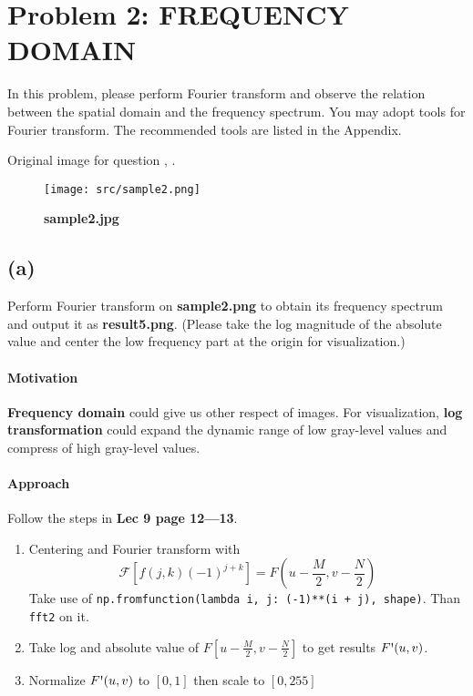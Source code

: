 \newpage
\section{Problem 2: FREQUENCY DOMAIN}\label{problem-2-frequency-domain}
In this problem, please perform Fourier transform and observe the relation between the spatial domain and the frequency spectrum. You may adopt tools for Fourier transform. The recommended tools are listed in the Appendix.

Original image  for question  , .
\begin{figure}
    \centering
    \texttt{[image: src/sample2.png]}
    \caption{\textbf{sample2.jpg}}
    \label{sample2}
\end{figure}

\subsection{(a)}\label{2_a}
Perform Fourier transform on \textbf{sample2.png} to obtain its frequency spectrum and output it as \textbf{result5.png}. (Please take the log magnitude of the absolute value and center the low frequency part at the origin for visualization.)

\paragraph{Motivation}
\textbf{Frequency domain} could give us other respect of images.
For visualization, \textbf{log transformation} could expand the dynamic range of low gray-level values and compress of high gray-level values.

\paragraph{Approach}
Follow the steps in \textbf{Lec 9 page 12---13}.
\begin{enumerate}
    \item Centering and Fourier transform with \\
	\[
	    \mathcal{F}[f(j, k)(-1)^{j+k}] = F(u - \frac{M}{2}, v - \frac{N}{2})
	\]
	Take use of \texttt{np.fromfunction(lambda i, j: (-1)**(i + j), shape)}.
	Than \texttt{fft2} on it.
    \item Take log and absolute value of \(F[u - \frac{M}{2}, v - \frac{N}{2}]\) to get results \(F\textnormal{\textquotesingle}(u, v)\).
    \item Normalize \(F\textnormal{\textquotesingle}(u, v)\) to \([0, 1]\) then scale to \([0, 255]\)
\end{enumerate}


